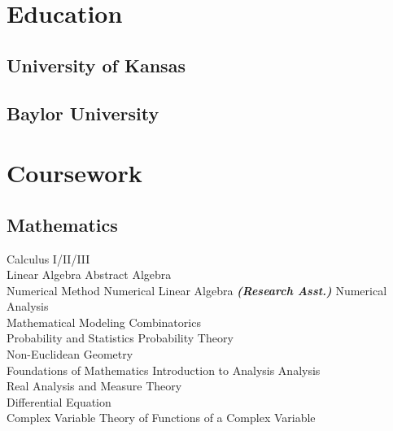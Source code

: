 \documentclass[]{deedy-resume-openfont}
\begin{document}
\begin{minipage}[t]{0.66\textwidth} 




\section{Education} 
\subsection{University of Kansas}

\sectionsep

\subsection{Baylor University}
\sectionsep



\section{Coursework}
\subsection{Mathematics}
Calculus I/II/III  \\
Linear Algebra \textbullet{} Abstract Algebra\\
Numerical Method \textbullet{}
Numerical Linear Algebra 
{\footnotesize \textit{\textbf{(Research Asst.) }}}  \textbullet{} Numerical Analysis \\
Mathematical Modeling \textbullet{} Combinatorics\\
Probability and Statistics \textbullet{} Probability Theory \\
Non-Euclidean Geometry \\
Foundations of Mathematics \textbullet{}
Introduction to Analysis \textbullet{} Analysis \\
\textbullet{} Real Analysis and Measure Theory \\
Differential Equation \\
Complex Variable \textbullet{}Theory of Functions of a Complex Variable\\
\sectionsep

\end{minipage}
\end{document}
